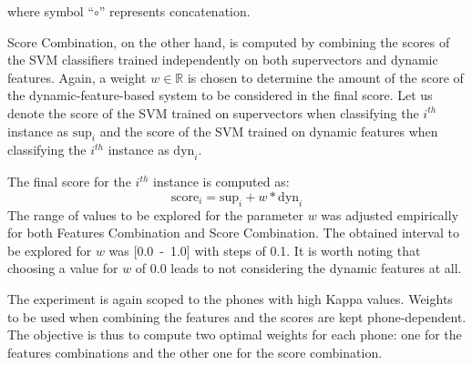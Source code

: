 where symbol ``$\circ$'' represents concatenation.

Score Combination, on the other hand, is computed by combining the scores
of the SVM classifiers trained independently on both supervectors and dynamic features.
Again, a weight $w \in \mathbb{R}$
is chosen to determine the amount of the score of the dynamic-feature-based system to be considered
in the final score. Let us denote
the score of the SVM trained on supervectors when classifying the $i^{th}$ instance
as $\text{sup}_{i}$ and the score of the SVM trained on dynamic features
when classifying the $i^{th}$ instance as
$\text{dyn}_{i}$.

The final score for the
$i^{th}$ instance is computed as:
\begin{equation}
	\text{score}_{i} = \text{sup}_{i} + w * \text{dyn}_{i}
\end{equation}
The range of values to be explored for the parameter $w$ was adjusted empirically for both
Features Combination and Score Combination. The obtained interval to be explored for $w$ was
\mbox{[0.0 - 1.0]} with steps of 0.1. It is worth noting that choosing
a value for $w$ of 0.0 leads to not considering the dynamic features at all.

The experiment is again scoped to the phones with high Kappa values.
Weights to be used when combining the features and the scores are kept phone-dependent.
The objective is thus to compute two optimal weights for each phone:
one for the features combinations and the other one for the score combination.



